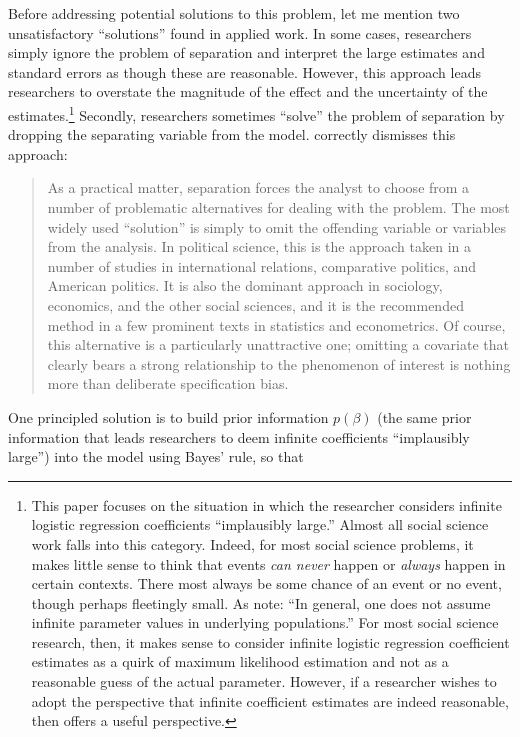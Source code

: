 \documentclass[12pt]{article}
\begin{document}
Before addressing potential solutions to this problem, let me mention two unsatisfactory ``solutions'' found in applied work. In some cases, researchers simply ignore the problem of separation and interpret the large estimates and standard errors as though these are reasonable. However, this approach leads researchers to overstate the magnitude of the effect and the uncertainty of the estimates.\footnote{This paper focuses on the situation in which the researcher considers infinite logistic regression coefficients ``implausibly large.'' Almost all social science work falls into this category. Indeed, for most social science problems, it makes little sense to think that events \textit{can never} happen or \textit{always} happen in certain contexts. There most always be some chance of an event or no event, though perhaps fleetingly small. As \citet[p. 2409]{HeinzeSchemper2002} note: ``In general, one does not assume infinite parameter values in underlying populations.'' For most social science research, then, it makes sense to consider infinite logistic regression coefficient estimates as a quirk of maximum likelihood estimation and not as a reasonable guess of the actual parameter.  However, if a researcher wishes to adopt the perspective that infinite coefficient estimates are indeed reasonable, then \cite{Geyer2009} offers a useful perspective.} Secondly, researchers sometimes ``solve'' the problem of separation by dropping the separating variable from the model. \citet[pp. 161-162]{Zorn2005} correctly dismisses this approach:

\begin{quote}
As a practical matter, separation forces the analyst to choose from a number of problematic alternatives for dealing with the problem. The most widely used ``solution'' is simply to omit the offending variable or variables from the analysis. In political science, this is the approach taken in a number of studies in international relations, comparative politics, and American politics. It is also the dominant approach in sociology, economics, and the other social sciences, and it is the recommended method in a few prominent texts in statistics and econometrics. Of course, this alternative is a particularly unattractive one; omitting a covariate that clearly bears a strong relationship to the phenomenon of interest is nothing more than deliberate specification bias.
\end{quote}

One principled solution is to build prior information $p(\beta)$ (the same prior information that leads researchers to deem infinite coefficients ``implausibly large'') into the model using Bayes' rule, so that 
\end{document}
